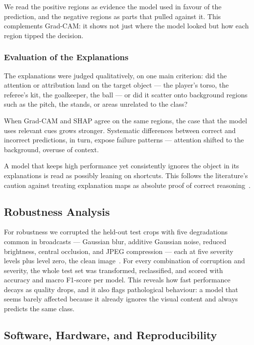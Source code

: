 \documentclass[preprint,12pt]{elsarticle}
\begin{document}
We read the positive regions as evidence the model used in favour of the prediction, and the negative regions as parts that pulled against it. This complements Grad-CAM: it shows not just where the model looked but how each region tipped the decision.

\subsubsection{Evaluation of the Explanations}

The explanations were judged qualitatively, on one main criterion: did the attention or attribution land on the target object --- the player's torso, the referee's kit, the goalkeeper, the ball --- or did it scatter onto background regions such as the pitch, the stands, or areas unrelated to the class?

When Grad-CAM and SHAP agree on the same regions, the case that the model uses relevant cues grows stronger. Systematic differences between correct and incorrect predictions, in turn, expose failure patterns --- attention shifted to the background, overuse of context.

A model that keeps high performance yet consistently ignores the object in its explanations is read as possibly leaning on shortcuts. This follows the literature's caution against treating explanation maps as absolute proof of correct reasoning~\cite{nazir2023survey}.

\subsection{Robustness Analysis}

For robustness we corrupted the held-out test crops with five degradations common in broadcasts --- Gaussian blur, additive Gaussian noise, reduced brightness, central occlusion, and JPEG compression --- each at five severity levels plus level zero, the clean image~\cite{hendrycks2019benchmarking}. For every combination of corruption and severity, the whole test set was transformed, reclassified, and scored with accuracy and macro F1-score per model. This reveals how fast performance decays as quality drops, and it also flags pathological behaviour: a model that seems barely affected because it already ignores the visual content and always predicts the same class.

\subsection{Software, Hardware, and Reproducibility}
\end{document}
